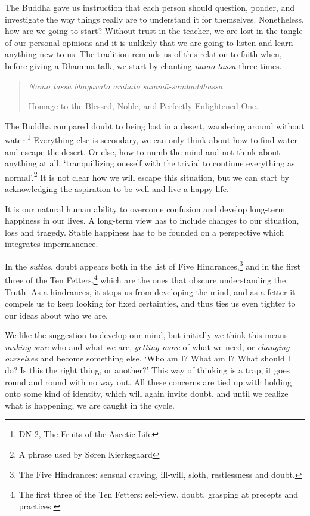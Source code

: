 The Buddha gave us instruction that each person should question, ponder,
and investigate the way things really are to understand it for
themselves. Nonetheless, how are we going to start? Without trust in the
teacher, we are lost in the tangle of our personal opinions and it is
unlikely that we are going to listen and learn anything new to us. The
tradition reminds us of this relation to faith when, before giving a
Dhamma talk, we start by chanting \emph{namo tassa} three times.

\begin{quote}
\emph{Namo tassa bhagavato arahato sammā-sambuddhassa}

Homage to the Blessed, Noble, and Perfectly Enlightened One.
\end{quote}


The Buddha compared doubt to being lost in a desert, wandering around
without water.\footnote{\href{https://suttacentral.net/dn2}{DN 2}, The
  Fruits of the Ascetic Life} Everything else is secondary, we can only
think about how to find water and escape the desert. Or else, how to
numb the mind and not think about anything at all, `tranquillizing
oneself with the trivial to continue everything as normal'.\footnote{A
  phrase used by Søren Kierkegaard} It is not clear how we will escape
this situation, but we can start by acknowledging the aspiration to be
well and live a happy life.

It is our natural human ability to overcome confusion and develop
long-term happiness in our lives. A long-term view has to include
changes to our situation, loss and tragedy. Stable happiness has to be
founded on a perspective which integrates impermanence.

In the \emph{suttas}, doubt appears both in the list of Five
Hindrances,\footnote{The Five Hindrances: sensual craving, ill-will,
  sloth, restlessness and doubt.} and in the first three of the Ten
Fetters,\footnote{The first three of the Ten Fetters: self-view, doubt,
  grasping at precepts and practices.} which are the ones that obscure
understanding the Truth. As a hindrances, it stops us from developing
the mind, and as a fetter it compels us to keep looking for fixed
certainties, and thus ties us even tighter to our ideas about who we
are.

We like the suggestion to develop our mind, but initially we think this
means \emph{making sure} who and what we are, \emph{getting more} of
what we need, or \emph{changing ourselves} and become something else.
`Who am I? What am I? What should I do? Is this the right thing, or
another?' This way of thinking is a trap, it goes round and round with
no way out. All these concerns are tied up with holding onto some kind
of identity, which will again invite doubt, and until we realize what is
happening, we are caught in the cycle.

